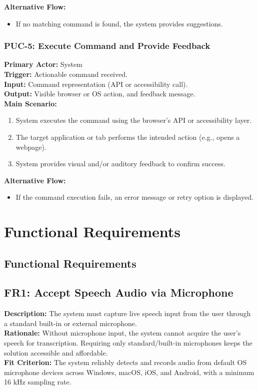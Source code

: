 \documentclass[11pt]{article}
\begin{document}
\textbf{Alternative Flow:}
\begin{itemize}
  \item If no matching command is found, the system provides suggestions.
\end{itemize}

\bigskip

\subsubsection*{PUC-5: Execute Command and Provide Feedback}
\textbf{Primary Actor:} System \\
\textbf{Trigger:} Actionable command received. \\
\textbf{Input:} Command representation (API or accessibility call). \\
\textbf{Output:} Visible browser or OS action, and feedback message. \\

\textbf{Main Scenario:}
\begin{enumerate}
  \item System executes the command using the browser’s API or accessibility layer.
  \item The target application or tab performs the intended action (e.g., opens a webpage).
  \item System provides visual and/or auditory feedback to confirm success.
\end{enumerate}

\textbf{Alternative Flow:}
\begin{itemize}
  \item If the command execution fails, an error message or retry option is displayed.
\end{itemize}


\section{Functional Requirements}
\subsection{Functional Requirements}

\subsection{FR1: Accept Speech Audio via Microphone}
\textbf{Description:} The system must capture live speech input from the user through a standard built-in or external microphone.\\
\textbf{Rationale:} Without microphone input, the system cannot acquire the user’s speech for transcription. Requiring only standard/built-in microphones keeps the solution accessible and affordable.\\
\textbf{Fit Criterion:} The system reliably detects and records audio from default OS microphone devices across Windows, macOS, iOS, and Android, with a minimum 16 kHz sampling rate.
\end{document}
